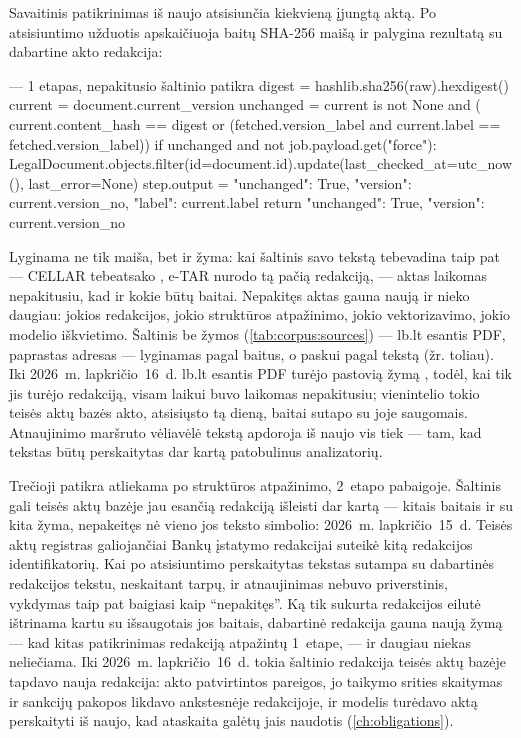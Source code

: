 Savaitinis patikrinimas iš naujo atsisiunčia kiekvieną įjungtą aktą. Po atsisiuntimo užduotis
apskaičiuoja baitų SHA-256 maišą ir palygina rezultatą su dabartine akto redakcija:

\begin{codefile}{ ---  1 etapas, nepakitusio šaltinio patikra}
digest = hashlib.sha256(raw).hexdigest()
current = document.current_version
unchanged = current is not None and (
    current.content_hash == digest or (fetched.version_label and current.label == fetched.version_label))
if unchanged and not job.payload.get("force"):
    LegalDocument.objects.filter(id=document.id).update(last_checked_at=utc_now(), last_error=None)
    step.output = {"unchanged": True, "version": current.version_no, "label": current.label}
    return {"unchanged": True, "version": current.version_no}
\end{codefile}

Lyginama ne tik maiša, bet ir žyma: kai šaltinis savo tekstą tebevadina taip pat --- CELLAR
tebeatsako , e-TAR nurodo tą pačią redakciją, --- aktas laikomas
nepakitusiu, kad ir kokie būtų baitai. Nepakitęs aktas gauna naują  ir
nieko daugiau: jokios redakcijos, jokio struktūros atpažinimo, jokio vektorizavimo, jokio
modelio iškvietimo. Šaltinis be žymos (\cref{tab:corpus:sources}) --- lb.lt esantis PDF,
paprastas adresas --- lyginamas pagal baitus, o paskui pagal tekstą (žr. toliau). Iki 2026~m.
lapkričio~16~d. lb.lt esantis PDF turėjo pastovią žymą , todėl, kai tik jis turėjo
redakciją, visam laikui buvo laikomas nepakitusiu; vienintelio tokio teisės aktų bazės akto,
atsisiųsto tą dieną, baitai sutapo su joje saugomais. Atnaujinimo maršruto vėliavėlė 
tekstą apdoroja iš naujo vis tiek --- tam, kad tekstas būtų perskaitytas
dar kartą patobulinus analizatorių.

Trečioji patikra atliekama po struktūros atpažinimo, 2~etapo pabaigoje. Šaltinis gali teisės
aktų bazėje jau esančią redakciją išleisti dar kartą --- kitais baitais ir su kita žyma,
nepakeitęs nė vieno jos teksto simbolio: 2026~m. lapkričio~15~d. Teisės aktų registras
galiojančiai Bankų įstatymo redakcijai suteikė kitą redakcijos identifikatorių. Kai po
atsisiuntimo perskaitytas tekstas sutampa su dabartinės redakcijos tekstu, neskaitant tarpų, ir
atnaujinimas nebuvo priverstinis, vykdymas taip pat baigiasi kaip \enquote{nepakitęs}. Ką tik
sukurta redakcijos eilutė ištrinama kartu su išsaugotais jos baitais, dabartinė redakcija gauna
naują žymą --- kad kitas patikrinimas redakciją atpažintų 1~etape, --- ir daugiau niekas
neliečiama. Iki 2026~m. lapkričio~16~d. tokia šaltinio redakcija teisės aktų bazėje tapdavo
nauja redakcija: akto patvirtintos pareigos, jo taikymo srities skaitymas ir sankcijų pakopos
likdavo ankstesnėje redakcijoje, ir modelis turėdavo aktą perskaityti iš naujo, kad ataskaita
galėtų jais naudotis (\cref{ch:obligations}).

